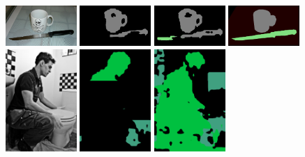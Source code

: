 \begin{figure}[tbh!]
  {\includegraphics[width=0.24\textwidth]{figures/experiments/coco/image/0032.jpg}}
  {\includegraphics[width=0.24\textwidth]{figures/experiments/coco/orgckpt/0032.png}}
  {\includegraphics[width=0.24\textwidth]{figures/experiments/coco/nonnoisy/0032.png}}
  {\includegraphics[width=0.24\textwidth]{figures/experiments/coco/gt/000000002592_instanceTrainIds.png}}
    {\includegraphics[width=0.24\textwidth]{figures/experiments/coco/image/0035.jpg}}
  {\includegraphics[width=0.24\textwidth]{figures/experiments/coco/orgckpt/0035.png}}
  {\includegraphics[width=0.24\textwidth]{figures/experiments/coco/nonnoisy/0035.png}}

\end{figure}
